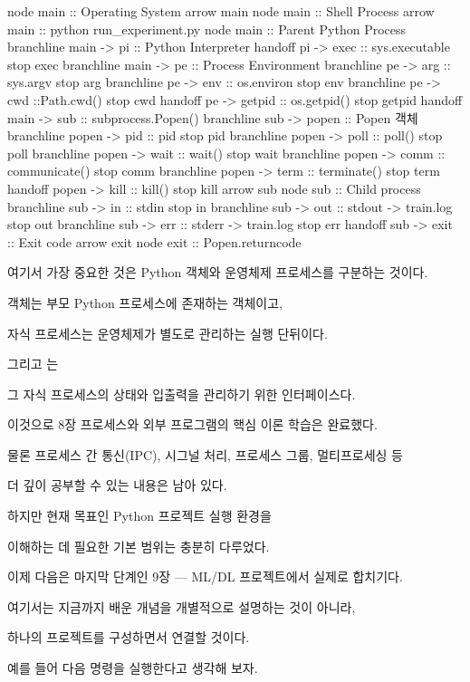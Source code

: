 \begin{dhkbranch}[in=6]
node main :: Operating System
arrow main
node main :: Shell Process
arrow main :: python run_experiment.py
node main :: Parent Python Process
branchline main -> pi :: Python Interpreter
handoff pi -> exec :: sys.executable
stop exec
branchline main -> pe :: Process Environment 
branchline pe -> arg :: sys.argv 
stop arg
branchline pe -> env :: os.environ 
stop env
branchline pe -> cwd ::Path.cwd()
stop cwd
handoff pe -> getpid :: os.getpid()
stop getpid
handoff main -> sub :: subprocess.Popen()
branchline sub -> popen :: Popen 객체
branchline popen -> pid :: pid
stop pid
branchline popen -> poll :: poll()
stop poll
branchline popen -> wait :: wait()
stop wait
branchline popen -> comm :: communicate()
stop comm
branchline popen -> term :: terminate()
stop term
handoff popen -> kill :: kill()
stop kill
arrow sub
node sub :: Child process
branchline sub -> in :: stdin
stop in
branchline sub -> out :: stdout -> train.log
stop out
branchline sub -> err :: stderr -> train.log
stop err
handoff sub -> exit :: Exit code
arrow exit
node exit :: Popen.returncode
\end{dhkbranch}

여기서 가장 중요한 것은 Python 객체와 운영체제 프로세스를 구분하는 것이다.

 객체는 부모 Python 프로세스에 존재하는 객체이고,

자식 프로세스는 운영체제가 별도로 관리하는 실행 단뒤이다.

그리고 는

그 자식 프로세스의 상태와 입출력을 관리하기 위한 인터페이스다.

이것으로 8장 프로세스와 외부 프로그램의 핵심 이론 학습은 완료했다.

물론 프로세스 간 통신(IPC), 시그널 처리, 프로세스 그룹, 멀티프로세싱 등 

더 깊이 공부할 수 있는 내용은 남아 있다.

하지만 현재 목표인 Python 프로젝트 실행 환경을 

이해하는 데 필요한 기본 범위는 충분히 다루었다.

이제 다음은 마지막 단계인 9장 — ML/DL 프로젝트에서 실제로 합치기다.

여기서는 지금까지 배운 개념을 개별적으로 설명하는 것이 아니라, 

하나의 프로젝트를 구성하면서 연결할 것이다.

예를 들어 다음 명령을 실행한다고 생각해 보자.

